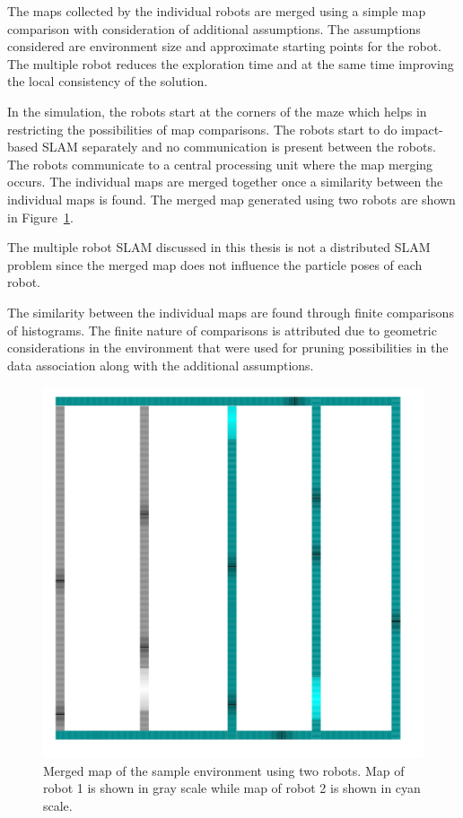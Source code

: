 The maps collected by the individual robots are merged using a simple map comparison with consideration of additional assumptions. The assumptions considered are environment size and approximate starting points for the robot. The multiple robot reduces the exploration time and at the same time improving the local consistency of the solution.

In the simulation, the robots start at the corners of the maze which helps in restricting the possibilities of map comparisons. The robots start to do impact-based SLAM separately and no communication is present between the robots. The robots communicate to a central processing unit where the map merging occurs. The individual maps are merged together once a similarity between the individual maps is found. The merged map generated using two robots are shown in Figure~\ref{merge_map}. 

\begin{rem}
The multiple robot SLAM discussed in this thesis is not a distributed SLAM problem since the merged map does not influence the particle poses of each robot.
\end{rem}

The similarity between the individual maps are found through finite comparisons of histograms. The finite nature of comparisons is attributed due to geometric considerations in the environment that were used for pruning possibilities in the data association along with the additional assumptions.
\begin{figure}
\centering
\includegraphics[scale=0.6]{./images/merge_map}
\caption[Merged map of the sample environment using two robots]{Merged map of the sample environment using two robots. Map of robot 1 is shown in gray scale while map of robot 2 is shown in cyan scale.}
\label{merge_map}
\end{figure} 

